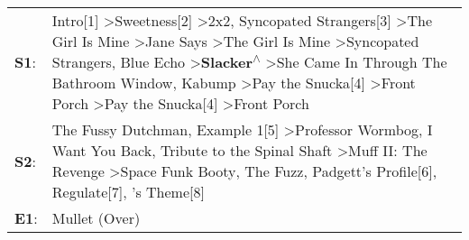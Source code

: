 \begin{supertabular}{p{0.03\textwidth}p{0.92\textwidth}}
 \textbf{S1}:  &  Intro[1]\textsuperscript{} \textgreater \enspace Sweetness[2]\textsuperscript{} \textgreater \enspace 2x2\textsuperscript{}, \enspace Syncopated Strangers[3]\textsuperscript{} \textgreater \enspace The Girl Is Mine\textsuperscript{} \textgreater \enspace Jane Says\textsuperscript{} \textgreater \enspace The Girl Is Mine\textsuperscript{} \textgreater \enspace Syncopated Strangers\textsuperscript{}, \enspace Blue Echo\textsuperscript{} \textgreater \enspace \textbf{Slacker\textsuperscript{$\wedge$}} \textgreater \enspace She Came In Through The Bathroom Window\textsuperscript{}, \enspace Kabump\textsuperscript{} \textgreater \enspace Pay the Snucka[4]\textsuperscript{} \textgreater \enspace Front Porch\textsuperscript{} \textgreater \enspace Pay the Snucka[4]\textsuperscript{} \textgreater \enspace Front Porch\textsuperscript{}  \enspace  \\
 \textbf{S2}:  &                                                                                                                                                                                                                                                                                                                               The Fussy Dutchman\textsuperscript{}, \enspace Example 1[5]\textsuperscript{} \textgreater \enspace Professor Wormbog\textsuperscript{}, \enspace I Want You Back\textsuperscript{}, \enspace Tribute to the Spinal Shaft\textsuperscript{} \textgreater \enspace Muff II: The Revenge\textsuperscript{} \textgreater \enspace Space Funk Booty\textsuperscript{}, \enspace The Fuzz\textsuperscript{}, \enspace Padgett's Profile[6]\textsuperscript{}, \enspace Regulate[7]\textsuperscript{}, 's Theme[8]\textsuperscript{}  \enspace  \\
 \textbf{E1}:  &                                                                                                                                                                                                                                                                                                                                                                                                                                                                                                                                                                                                                                                                                                                                                                                                                                         Mullet (Over)\textsuperscript{}  \enspace  \\
\end{supertabular}
